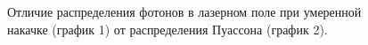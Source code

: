 \begin{figure}
\centering



\caption{Отличие распределения фотонов в лазерном поле при умеренной
  накачке (график 1) от распределения Пуассона 
(график 2).}
\label{figPart2Ch1_5}
\end{figure}
